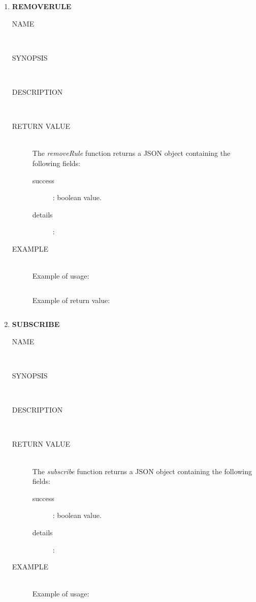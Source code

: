 \documentclass{article}
\begin{document}
\begin{enumerate}
    \item \textbf{REMOVERULE}
        \begin{description}
        \item[NAME] \hfill \\
    	\item[SYNOPSIS] \hfill \\
    	\item[DESCRIPTION] \hfill \\
        \item[RETURN VALUE] \hfill \\
        The \textit{removeRule} function returns a JSON object containing the following fields:
        \begin{description}
		    \item[success]: boolean value.
		    \item[details]:
		\end{description}
        \item[EXAMPLE] \hfill \\
    	Example of usage:
    	\begin{lstlisting}
    	\end{lstlisting}
    	Example of return value:
        \begin{lstlisting}
        \end{lstlisting}
        \end{description}
    \item \textbf{SUBSCRIBE}
        \begin{description}
        \item[NAME] \hfill \\
    	\item[SYNOPSIS] \hfill \\
    	\item[DESCRIPTION] \hfill \\
        \item[RETURN VALUE] \hfill \\
        The \textit{subscribe} function returns a JSON object containing the following fields:
        \begin{description}
		    \item[success]: boolean value.
		    \item[details]:
		\end{description}
        \item[EXAMPLE] \hfill \\
    	Example of usage:
    	\begin{lstlisting}
    	\end{lstlisting}

\end{description}
\end{enumerate}
\end{document}
